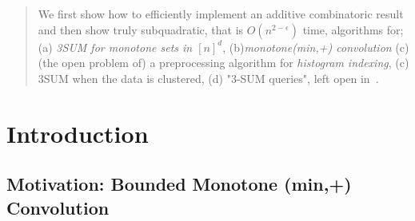 \documentclass[11pt]{article}
\begin{document}
\begin{abstract}
{We first show how to efficiently implement an additive combinatoric result and then show truly subquadratic, that is $O(n^{2-\epsilon})$ time, algorithms for; (a) {\em 3SUM for monotone sets in $[n]^d$}, (b){\em monotone(min,+) convolution} (c) (the open problem of) a preprocessing algorithm for {\em histogram indexing}, (c) 3SUM when the data is clustered, (d) "3-SUM queries", left open in~\cite{BW12}.
}
\end{abstract}


\newpage

\section{Introduction}

\subsection{Motivation: Bounded Monotone (min,+) Convolution}
\end{document}
